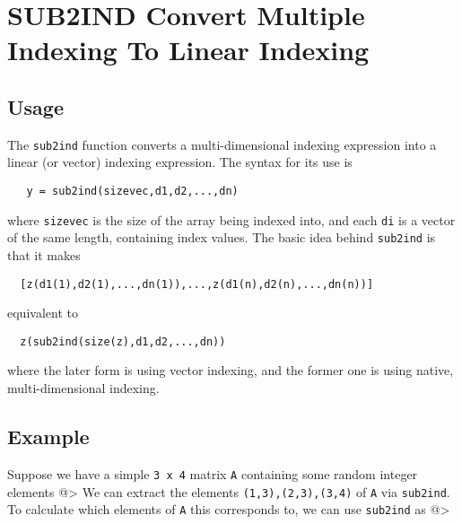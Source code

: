 \section{SUB2IND Convert Multiple Indexing To Linear Indexing}

\subsection{Usage}

The \verb|sub2ind| function converts a multi-dimensional indexing expression
into a linear (or vector) indexing expression.  The syntax for its use
is
\begin{verbatim}
   y = sub2ind(sizevec,d1,d2,...,dn)
\end{verbatim}
where \verb|sizevec| is the size of the array being indexed into, and each
\verb|di| is a vector of the same length, containing index values.  The basic
idea behind \verb|sub2ind| is that it makes
\begin{verbatim}
  [z(d1(1),d2(1),...,dn(1)),...,z(d1(n),d2(n),...,dn(n))]
\end{verbatim}
equivalent to
\begin{verbatim}
  z(sub2ind(size(z),d1,d2,...,dn))
\end{verbatim}
where the later form is using vector indexing, and the former one is using
native, multi-dimensional indexing.
\subsection{Example}

Suppose we have a simple \verb|3 x 4| matrix \verb|A| containing some random integer
elements
@>
We can extract the elements \verb|(1,3),(2,3),(3,4)| of \verb|A| via \verb|sub2ind|.
To calculate which elements of \verb|A| this corresponds to, we can use
\verb|sub2ind| as
@>
